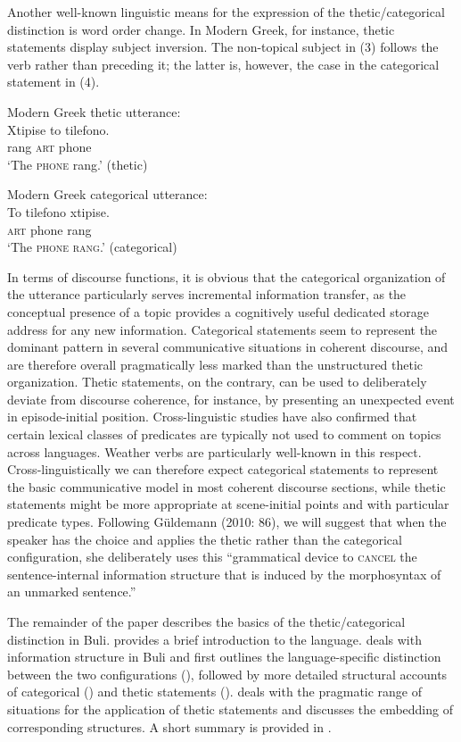 \documentclass[output=paper]{langsci/langscibook}
\begin{document}
Another well-known linguistic means for the expression of the thetic/categorical distinction is word order change. In Modern Greek, for instance, thetic statements display subject inversion. The non-topical subject in (3) follows the verb rather than preceding it; the latter is, however, the case in the categorical statement in (4).

\ea
{ Modern Greek   thetic utterance:}\\
\gll Xtipise    to    tilefono. \\
     rang    \textsc{art}    phone\\
\glt ‘The \textsc{phone} rang.’ (thetic)
\z

\ea
{ Modern Greek   categorical utterance:}\\
\gll To     tilefono   xtipise.\\
     \textsc{art}    phone     rang\\
\glt ‘The \textsc{phone rang}.’ (categorical) \citep[536]{Sasse1987}
\z

In terms of discourse functions, it is obvious that the categorical organization of the utterance particularly serves incremental information transfer, as the conceptual presence of a topic provides a cognitively useful dedicated storage address for any new information. Categorical statements seem to represent the dominant pattern in several communicative situations in coherent discourse, and are therefore overall pragmatically less marked than the unstructured thetic organization. Thetic statements, on the contrary, can be used to deliberately deviate from discourse coherence, for instance, by presenting an unexpected event in episode-initial position. Cross-linguistic studies \citep{Sasse1995} have also confirmed that certain lexical classes of predicates are typically not used to comment on topics across languages. Weather verbs are particularly well-known in this respect. Cross-linguistically we can therefore expect categorical statements to represent the basic communicative model in most coherent discourse sections, while thetic statements might be more appropriate at scene-initial points and with particular predicate types. Following Güldemann (2010: 86), we will suggest that when the speaker has the choice and applies the thetic rather than the categorical configuration, she deliberately uses this “grammatical device to \textsc{cancel} the sentence-internal information structure that is induced by the morphosyntax of an unmarked sentence.”

The remainder of the paper describes the basics of the thetic/categorical distinction in Buli.  provides a brief introduction to the language.  deals with information structure in Buli and first outlines the language-specific distinction between the two configurations (), followed by more detailed structural accounts of categorical () and thetic statements ().  deals with the pragmatic range of situations for the application of thetic statements and  discusses the embedding of corresponding structures. A short summary is provided in .
\end{document}
